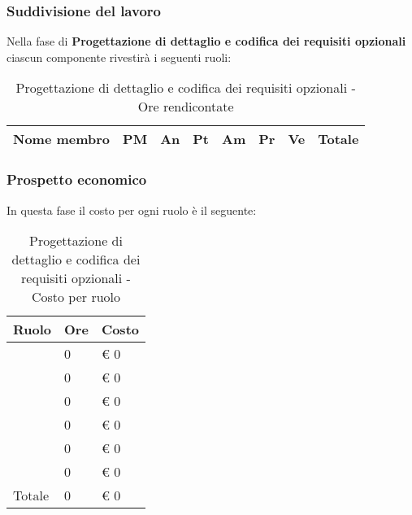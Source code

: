 		\subsubsection{Suddivisione del lavoro} %
		\label{ssub:suddivisione_del_lavoro}
		Nella fase di \textbf{Progettazione di dettaglio e codifica dei requisiti opzionali} ciascun componente rivestirà i seguenti ruoli: \\
			\begin{table}[!h]
				\begin{center}
					\begin{tabularx}{0.9\textwidth}{|l|l|l|l|l|l|l|X|}
						\hline
						\textbf{Nome membro} & \textbf{PM} & \textbf{An} & \textbf{Pt} & \textbf{Am} & \textbf{Pr} & \textbf{Ve} & \textbf{Totale} \\
						\hline
						
						\hline		
					\end{tabularx}
				\end{center}
			\caption{Progettazione di dettaglio e codifica dei requisiti opzionali - Ore rendicontate}
			\end{table}
			
		
		\subsubsection{Prospetto economico} %
		\label{ssub:prospetto_economico}
		In questa fase il costo per ogni ruolo è il seguente: \\
				\begin{table}[!h]
					\begin{center}
						\begin{tabularx}{0.6\textwidth}{|l|l|X|}
							\hline
							\textbf{Ruolo} & \textbf{Ore} & \textbf{Costo} \\
							\hline
							\roleProjectManager & 0 & \euro{} 0 \\
							\hline
							\roleAnalyst & 0 & \euro{} 0 \\
							\hline
							\roleDesigner & 0 & \euro{} 0 \\
							\hline
							\roleAdministrator & 0 & \euro{} 0 \\
							\hline
							\roleProgrammer & 0 & \euro{} 0 \\
							\hline
							\roleVerifier & 0 & \euro{} 0 \\
							\hline
							Totale & 0 & \euro{} 0 \\
							\hline
						\end{tabularx}
					\end{center}
				\caption{Progettazione di dettaglio e codifica dei requisiti opzionali - Costo per ruolo}
				\end{table}

